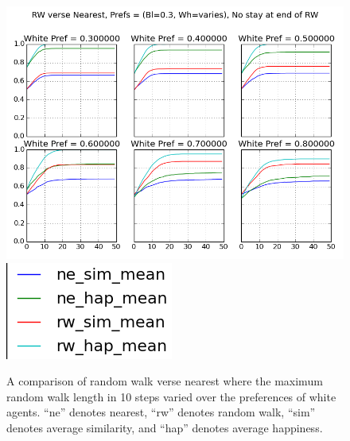 \documentclass[11pt,twoside]{amsart}
\theoremstyle{theorem}
\theoremstyle{definition}
\theoremstyle{remark}
\begin{document}
    \begin{figure}[p]
        \center
        \includegraphics[scale=0.60]{compare_nearest_rw.png}
        \includegraphics[scale=0.50]{compare_nearest_rw_legend.png}
        \caption{A comparison of random walk verse nearest where the maximum random walk length in 10 steps varied over the preferences of white agents. ``ne'' denotes nearest, ``rw'' denotes random walk, ``sim'' denotes average similarity, and ``hap'' denotes average happiness.}
        \label{fig:nearest_vs_rw}
    \end{figure}
\end{document}
